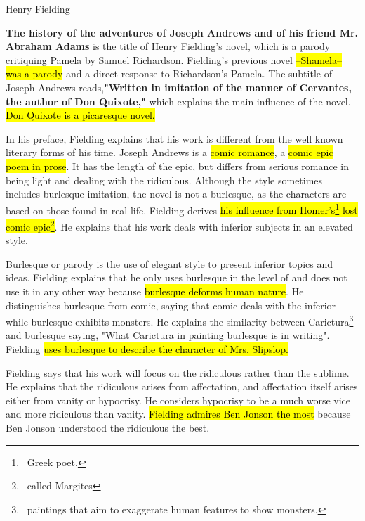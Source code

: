 \documentclass[12pt, a4paper]{article}
\begin{document}

\enlargethispage{\baselineskip}
\titlehead{Joseph Andrews}{Henry Fielding}



\ind \textbf{The history of the adventures of Joseph Andrews and of his friend Mr. Abraham Adams} is the 
title of Henry Fielding's novel, which is a parody critiquing Pamela by Samuel Richardson.
Fielding's previous novel \hl{--Shamela-- was a parody} and a direct response to Richardson's Pamela.
The subtitle of Joseph Andrews reads,\textbf{"Written in imitation of the manner of Cervantes,
the author of Don Quixote,"} which explains the main influence of the novel. \hl{Don Quixote is a picaresque
novel.} 


\ind In his preface, Fielding explains that his work is different from the well known
literary forms of his time. Joseph Andrews is a \hl{comic romance}, a \hl{comic epic
poem in prose}. It has the length of the epic, but differs from serious romance
in being light and dealing with the ridiculous. Although the style sometimes 
includes burlesque  imitation, the novel is not a burlesque, as the characters are
based on those found in real life. Fielding derives \hl{his influence from Homer's\footnote{
\, Greek poet.} lost comic epic\footnote{\, called Margites}}. He explains that his work deals with inferior subjects
in an elevated style.


\ind Burlesque or parody is the use of elegant style to present inferior topics and ideas. 
Fielding explains that he only uses burlesque in the level of 
and does not use it in any other way because \hl{burlesque deforms human nature}. He 
distinguishes burlesque from comic, saying that comic deals with the inferior while
burlesque exhibits monsters. He
explains the similarity between Carictura\footnote{\, paintings that aim to
exaggerate human features to show monsters.} and burlesque saying,
"What Carictura in painting \underline{burlesque} is in writing". Fielding \hl{uses
burlesque to describe the character of Mrs. Slipslop.}



\ind Fielding says that his work will focus on the ridiculous rather than the sublime.
He explains that the ridiculous arises from affectation, and 
affectation itself arises either from vanity or hypocrisy.
He considers hypocrisy to be a much worse vice and more ridiculous than vanity.
\hl{Fielding admires Ben Jonson the most} because Ben Jonson understood the ridiculous the best.
\end{document}
